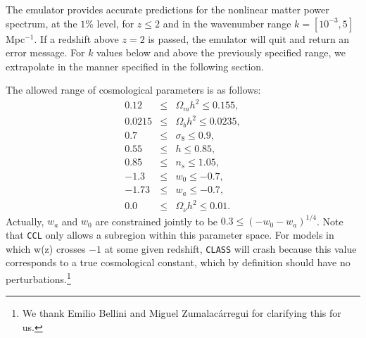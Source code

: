 \documentclass[\docopts]{\docclass}
\newcommand{\ccl}{{\tt CCL}\xspace}
\begin{document}
The emulator provides accurate predictions for the nonlinear matter power spectrum, at the $1\%$ level,
for $z\leq 2$ and in the wavenumber range $k=[10^{-3},5]$ Mpc$^{-1}$. If a redshift above $z=2$ is passed,
the emulator will quit and return an error message. For $k$ values below and above the previously
specified range, we extrapolate in the manner specified in the following section.

The allowed range of cosmological parameters is as follows:
\begin{eqnarray}
0.12&\leq& \Omega_m h^2 \leq 0.155,\nonumber\\
0.0215&\leq& \Omega_b h^2 \leq 0.0235,\nonumber\\
0.7&\leq& \sigma_8 \leq 0.9,\nonumber\\
0.55&\leq& h \leq 0.85,\nonumber\\
0.85&\leq& n_s\leq 1.05,\nonumber\\
-1.3&\leq& w_0\leq-0.7,\nonumber\\
-1.73&\leq& w_a\leq -0.7,\nonumber\\
0.0&\leq& \Omega_\nu h^2 \leq 0.01.
\end{eqnarray}
Actually, $w_a$ and $w_0$ are constrained jointly to be $0.3\leq (-w_0-w_a)^{1/4}$. Note that \ccl
only allows a subregion within this parameter space. For models in which w(z) crosses $-1$ at some
given redshift, {\tt CLASS} will crash because this value corresponds to a true cosmological
constant, which by definition should have no perturbations.\footnote{We thank Emilio Bellini and 
Miguel Zumalac\'arregui for clarifying this for us.}
\end{document}
